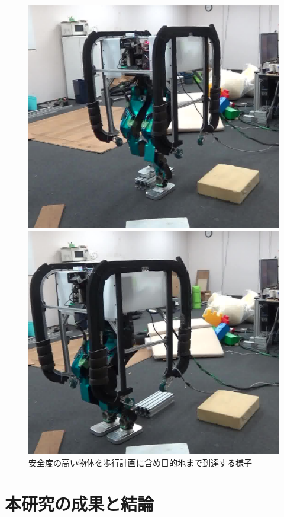 \documentclass[twocolumn]{preport}
\begin{document}
\begin{figure}[tbh]
\begin{center}
\begin{minipage}{0.24\columnwidth}
      \includegraphics[width=0.95\columnwidth]{stephard17}
    \end{minipage}
    \begin{minipage}{0.24\columnwidth}
      \includegraphics[width=0.95\columnwidth]{stephard25}
    \end{minipage}
    \caption{安全度の高い物体を歩行計画に含め目的地まで到達する様子}
    \label{stephard}
  \end{center}
\end{figure}


\section{本研究の成果と結論}



\end{document}
